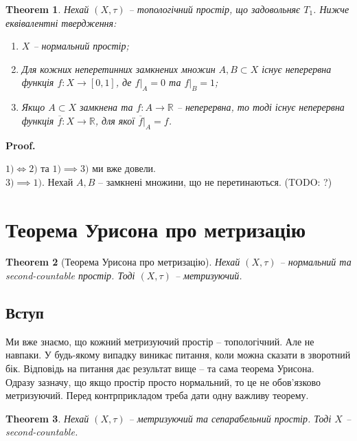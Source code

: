 \documentclass[a4paper, 10pt]{article}
\makeatletter
\theoremstyle{theoremdd}
\newtheorem{theorem}{Theorem}[subsection]
\renewenvironment{proof}[1][Proof.\\]{\par
\pushQED{\hfill \qed}%
\normalfont \topsep6\p@\@plus6\p@\relax
\trivlist
\item\relax
{\bfseries
#1\@addpunct{.}}\hspace\labelsep\ignorespaces
}{%
\popQED\endtrivlist\@endpefalse
}
\makeatother
\begin{document}
\begin{theorem}
Нехай $(X,\tau)$ -- топологічний простір, що задовольняє $T_1$. Нижче еквівалентні твердження:
\begin{enumerate}[nosep,wide=0pt,label={\arabic*)}]
\item $X$ -- нормальний простір;
\item Для кожних неперетинних замкнених множин $A,B \subset X$ існує неперервна функція $f \colon X \to [0,1]$, де $f|_A = 0$ та $f|_B = 1$;
\item Якщо $A \subset X$ замкнена та $f \colon A \to \mathbb{R}$ -- неперервна, то тоді існує неперервна функція $\overline{f} \colon X \to \mathbb{R}$, для якої $\overline{f}|_A = f$.
\end{enumerate}
\end{theorem}

\begin{proof}
$\boxed{1) \iff 2)}$ та $\boxed{1) \implies 3)}$ ми вже довели.\\
$\boxed{3) \implies 1)}$. Нехай $A,B$ -- замкнені множини, що не перетинаються. (TODO: ?)
\end{proof}
\newpage

\section{Теорема Урисона про метризацію}
\begin{theorem}[Теорема Урисона про метризацію]
Нехай $(X,\tau)$ -- нормальний та second-countable простір. Тоді $(X,\tau)$ -- метризуючий.
\end{theorem}

\subsection{Вступ}
Ми вже знаємо, що кожний метризуючий простір -- топологічний. Але не навпаки. У будь-якому випадку виникає питання, коли можна сказати в зворотний бік. Відповідь на питання дає результат вище -- та сама теорема Урисона.\\
Одразу зазначу, що якщо простір просто нормальний, то це не обов'язково метризуючий. Перед контрприкладом треба дати одну важливу теорему.

\begin{theorem}
Нехай $(X,\tau)$ -- метризуючий та сепарабельний простір. Тоді $X$ -- second-countable.
\end{theorem}
\end{document}
